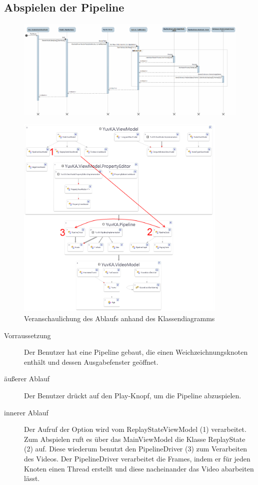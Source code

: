 \subsection{Abspielen der Pipeline}
\begin{figure}[h!]
\begin{center}
\includegraphics[width=0.9\textheight,angle=90]{Diagrams/play.png}
\end{center}
\end{figure}
\newpage

\begin{figure}[h!]
\begin{center}
\includegraphics[width=0.9\textwidth]{Diagrams/visualization_TC3.png}
\end{center}
\caption{Veranschaulichung des Ablaufs anhand des Klassendiagramms}
\end{figure}
\begin{description}
	\item[Vorraussetzung] Der Benutzer hat eine Pipeline gebaut, die einen Weichzeichnungsknoten enthält und dessen Ausgabefenster geöffnet.
	\item[äußerer Ablauf] Der Benutzer drückt auf den Play-Knopf, um die Pipeline abzuspielen.
	\item[innerer Ablauf] Der Aufruf der Option wird vom ReplayStateViewModel (1) verarbeitet. Zum Abspielen ruft es  über das MainViewModel die Klasse ReplayState (2) auf. Diese wiederum benutzt den PipelineDriver (3) zum Verarbeiten des Videos. Der PipelineDriver verarbeitet die Frames, indem er für jeden Knoten einen Thread erstellt und diese nacheinander das Video abarbeiten lässt.
\end{description}
